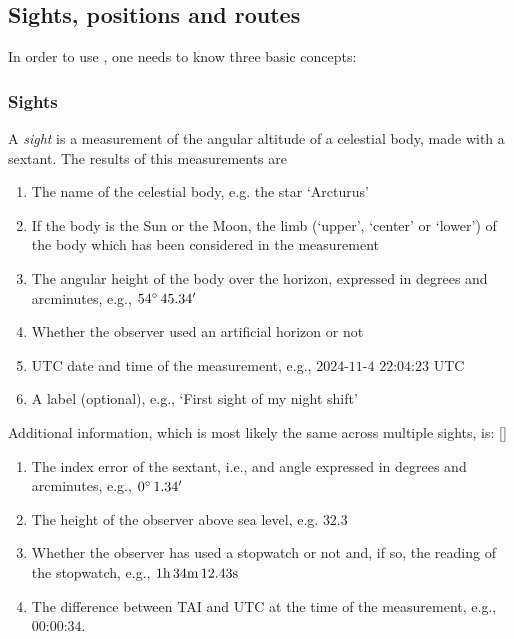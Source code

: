 \documentclass{ol-softwaremanual}
\begin{document}
\subsection{Sights, positions and routes}

In order to use \thel, one needs to know three basic concepts: 
\subsubsection{Sights} \label{section-sights} 

A \textit{sight} is a measurement of the angular altitude of a celestial body, made with a sextant. 
The results of this measurements are 
\begin{enumerate}
\item \label{item-name} The name of the celestial body, e.g. the star `Arcturus'
\item \label{item-limb}  If the body is the Sun or the Moon, the limb (`upper', `center' or `lower') of the body which has been considered in the measurement
\item \label{item-body-height} The angular height of the  body over the horizon, expressed in degrees and arcminutes, e.g., $54 \degree \, 45.34'$
\item \label{item-artificial-horizon} Whether the observer used an artificial horizon or not
\item \label{item-time} \ac{UTC} date and time of the measurement, e.g., $2024$-$11$-$4$ $22$:$04$:$23$ \ac{UTC}
\item \label{item-label} A label (optional), e.g., `First sight of my night shift'
\end{enumerate}

Additional information, which is most likely the same across multiple sights, is: 
[]
\begin{enumerate}[resume]
  \item \label{item-index-error} The index error \cite{bowditch2002the} of the sextant,  i.e., and angle expressed in degrees and arcminutes, e.g., $0 \degree \, 1.34'$
  \item \label{item-observer-height} The height of the observer above sea level, e.g. $32.3$ \ft
  \item \label{item-stopwatch} Whether the observer has used a stopwatch or not and, if so, the reading of the stopwatch, e.g., $1\textrm{h} \, 34 \textrm{m} \, 12.43 \textrm{s}$
  \item \label{item-tai-utc} The difference between \ac{TAI} and \ac{UTC} at the time of the measurement, e.g., $00$:$00$:$34$. 
\end{enumerate}
\end{document}
